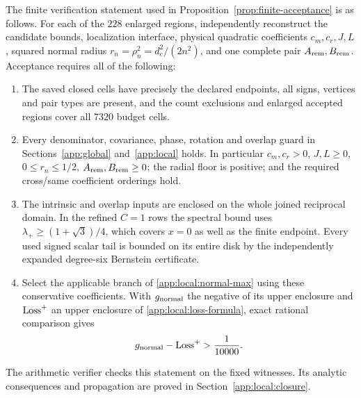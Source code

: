 The finite verification statement used in
Proposition~\ref{prop:finite-acceptance} is as follows.
For each of the $228$ enlarged regions, independently reconstruct the
candidate bounds, localization interface, physical quadratic coefficients
$c_m,c_r,J,L$, squared normal radius $r_n=\rho_n^2=d_c^2/(2n^2)$, and one complete pair
$A_{\rm rem},B_{\rm rem}$. Acceptance requires all of the following:
\begin{enumerate}
\item The saved closed cells have precisely the declared endpoints,
all signs, vertices and pair types are present, and the count exclusions
and enlarged accepted regions cover all $7320$ budget cells.
\item Every denominator, covariance, phase, rotation and overlap guard
in Sections~\ref{app:global} and~\ref{app:local} holds. In particular
$c_m,c_r>0$, $J,L\ge0$, $0\le r_n\le1/2$,
$A_{\rm rem},B_{\rm rem}\ge0$; the radial floor is positive; and the
required cross/same coefficient orderings hold.
\item The intrinsic and overlap inputs are enclosed on the whole joined
reciprocal domain. In the refined $C=1$ rows the spectral bound uses
$\lambda_+\ge(1+\sqrt3)/4$, which covers $x=0$ as well as the finite
endpoint. Every used signed scalar tail is bounded on its entire disk
by the independently expanded degree-six Bernstein certificate.
\item Select the applicable branch of
\eqref{app:local:normal-max} using these conservative coefficients.
With $g_{\rm normal}$ the negative of its upper enclosure and
${\rm Loss}^+$ an upper enclosure of
\eqref{app:local:loss-formula}, exact rational comparison gives
\begin{equation}\label{app:certificates:accepted-margin}
 g_{\rm normal}-{\rm Loss}^+>\frac1{10000}.
\end{equation}
\end{enumerate}
The arithmetic verifier checks this statement on the fixed witnesses.
Its analytic consequences and propagation are proved in
Section~\ref{app:local:closure}.

